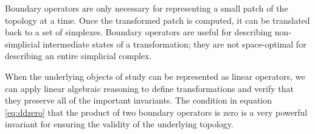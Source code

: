 \documentclass[twocolumn]{article}
\begin{document}
Boundary operators are only necessary for representing a small patch of the topology at a time.
Once the transformed patch is computed, it can be translated back to a set of simplexes.
Boundary operators are useful for describing non-simplicial intermediate states of a transformation; they are not space-optimal for describing an entire simplicial complex.

When the underlying objects of study can be represented as linear operators, we can apply linear algebraic reasoning to define transformations and verify that they preserve all of the important invariants.
The condition in equation \eqref{eq:ddzero} that the product of two boundary operators is zero is a very powerful invariant for ensuring the validity of the underlying topology.



\end{document}
